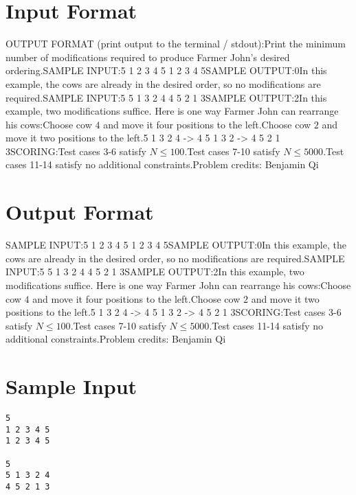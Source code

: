 \documentclass[12pt]{article}
\begin{document}
\section*{Input Format}
OUTPUT FORMAT (print output to the terminal / stdout):Print the minimum number of modifications required to produce Farmer John's desired ordering.SAMPLE INPUT:5
1 2 3 4 5
1 2 3 4 5SAMPLE OUTPUT:0In this example, the cows are already in the desired order, so no modifications are required.SAMPLE INPUT:5
5 1 3 2 4
4 5 2 1 3SAMPLE OUTPUT:2In this example, two modifications suffice. Here is one way Farmer John can rearrange his cows:Choose cow $4$ and move it four positions to the left.Choose cow $2$ and move it two positions to the left.5 1 3 2 4
-> 4 5 1 3 2
-> 4 5 2 1 3SCORING:Test cases 3-6 satisfy $N\le 100$.Test cases 7-10 satisfy $N\le 5000$.Test cases 11-14 satisfy no additional constraints.Problem credits: Benjamin Qi

\section*{Output Format}
SAMPLE INPUT:5
1 2 3 4 5
1 2 3 4 5SAMPLE OUTPUT:0In this example, the cows are already in the desired order, so no modifications are required.SAMPLE INPUT:5
5 1 3 2 4
4 5 2 1 3SAMPLE OUTPUT:2In this example, two modifications suffice. Here is one way Farmer John can rearrange his cows:Choose cow $4$ and move it four positions to the left.Choose cow $2$ and move it two positions to the left.5 1 3 2 4
-> 4 5 1 3 2
-> 4 5 2 1 3SCORING:Test cases 3-6 satisfy $N\le 100$.Test cases 7-10 satisfy $N\le 5000$.Test cases 11-14 satisfy no additional constraints.Problem credits: Benjamin Qi

\section*{Sample Input}
\begin{verbatim}
5
1 2 3 4 5
1 2 3 4 5

5
5 1 3 2 4
4 5 2 1 3
\end{verbatim}
\end{document}
